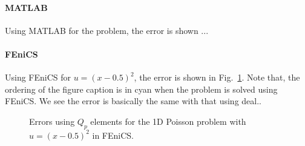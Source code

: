 \documentclass[review,3p]{elsarticle}
\begin{document}
\paragraph{MATLAB}
Using MATLAB for the problem, the error is shown ...

\paragraph{FEniCS}
Using FEniCS for $u=(x-0.5)^2$, the error is shown in Fig.~\ref{py_error_fenics_1d_0_pois_0_u_x_m_0p5_square_0_sm}. Note that, the ordering of the figure caption is in cyan when the problem is solved using FEniCS.
We see the error is basically the same with that using deal..

\begin{figure}[!ht]
\caption{Errors using $Q_p$ elements for the 1D Poisson problem with $u=(x-0.5)^2$ in FEniCS.}
\label{py_error_fenics_1d_0_pois_0_u_x_m_0p5_square_0_sm}
\end{figure}
\end{document}
